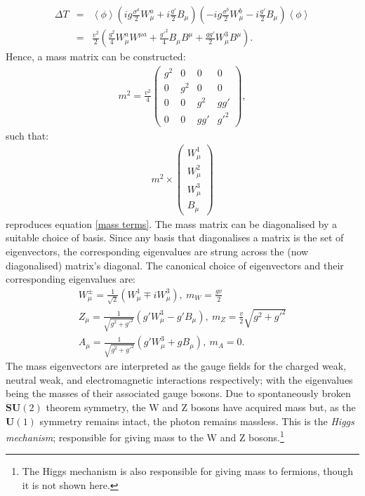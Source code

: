 \begin{eqnarray}
\Delta T &=& \left< \phi \right> \left( ig \frac{\sigma^{a}}{2}W_{\mu}^{a} + i \frac{g'}{2}B_{\mu} \right) \left(-ig\frac{\sigma^{b}}{2}W_{\mu}^{b} - i\frac{g'}{2}B_{\mu} \right) \left< \phi \right> \\
             &=& \frac{v^{2}}{2}\left( \frac{g^{2}}{4}W_{\mu}^{a}W^{\mu a} + \frac{{g'}^{2}}{4} B_{\mu}B^{\mu} + \frac{gg'}{2} W_{\mu}^{3}B^{\mu} \right).
             \label{mass terms}
\end{eqnarray}
Hence, a mass matrix can be constructed:
\begin{eqnarray}
m^{2} = \frac{v^{2}}{4}
	\begin{pmatrix}
	g^{2} & 0 & 0 & 0 \\
	0 & g^{2} & 0 & 0 \\
	0 & 0 & g^{2} & gg' \\
	0 & 0 & gg' & {g'}^{2}
	\end{pmatrix},
\end{eqnarray}
such that:
\begin{eqnarray}
m^{2} \times
	\begin{pmatrix}
	W_{\mu}^{1} \\
	W_{\mu}^{2} \\
	W_{\mu}^{3} \\
	B_{\mu}
	\end{pmatrix}
\end{eqnarray}
reproduces equation \ref{mass  terms}. The mass matrix can be diagonalised by a suitable choice of basis. Since any basis that diagonalises a matrix is the set of eigenvectors, the corresponding eigenvalues are strung across the (now diagonalised) matrix's diagonal. The canonical choice of eigenvectors and their corresponding eigenvalues are:
\begin{eqnarray}
W_{\mu}^{\pm} = \frac{1}{\sqrt{2}} \left( W_{\mu}^{1} \mp iW_{\mu}^{3} \right), \ m_{W} = \frac{g v}{2} \nonumber \\
Z_{\mu} = \frac{1}{\sqrt{g^{2} + {g'}^{2}}} \left( g'W_{\mu}^{3} - g' B_{\mu} \right), \ m_{Z} = \frac{v}{2}\sqrt{g^{2} + {g'}^{2}} \nonumber \\
A_{\mu} = \frac{1}{\sqrt{g^{2} + {g'}^{2}}} \left( g' W_{\mu}^{3} + g B_{\mu} \right), \ m_{A} = 0.
\end{eqnarray}
The mass eigenvectors are interpreted as the gauge fields for the charged weak, neutral weak, and electromagnetic interactions respectively; with the eigenvalues being the masses of their associated gauge bosons. Due to spontaneously broken $\mathbf{SU}(2)$ theorem symmetry, the W and Z bosons have acquired mass but, as the $\mathbf{U}(1)$ symmetry remains intact, the photon remains massless. This is the \emph{Higgs mechanism}; responsible for giving mass to the W and Z bosons.\footnote{The Higgs mechanism is also responsible for giving mass to fermions, though it is not shown here.}

